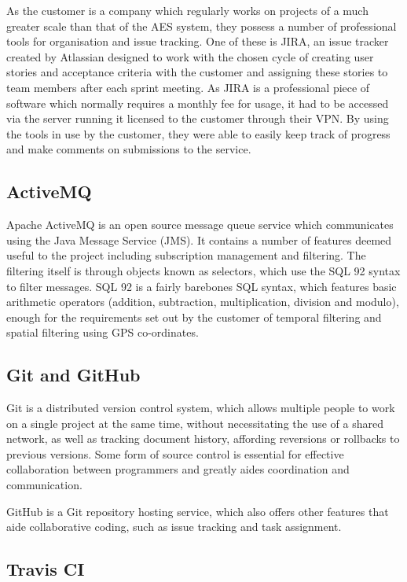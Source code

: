 \documentclass[a4paper, 12pt, twoside]{article}
\begin{document}
As the customer is a company which regularly works on projects of a much greater scale than that of the AES system, they possess a number of professional tools for organisation and issue tracking. One of these is JIRA, an issue tracker created by Atlassian designed to work with the chosen cycle of creating user stories and acceptance criteria with the customer and assigning these stories to team members after each sprint meeting. As JIRA is a professional piece of software which normally requires a monthly fee for usage, it had to be accessed via the server running it licensed to the customer through their VPN. By using the tools in use by the customer, they were able to easily keep track of progress and make comments on submissions to the service.

\subsection{ActiveMQ}
\label{sec:bg_activemq}

Apache ActiveMQ is an open source message queue service which communicates using the Java Message Service (JMS). It contains a number of features deemed useful to the project including subscription management and filtering. The filtering itself is through objects known as selectors, which use the SQL 92 syntax to filter messages. SQL 92 is a fairly barebones SQL syntax, which features basic arithmetic operators (addition, subtraction, multiplication, division and modulo), enough for the requirements set out by the customer of temporal filtering and spatial filtering using GPS co-ordinates.

\subsection{Git and GitHub}
\label{sec:bg_git}

Git is a distributed version control system, which allows multiple people to work on a single project at the same time, without necessitating the use of a shared network, as well as tracking document history, affording reversions or rollbacks to previous versions. Some form of source control is essential for effective collaboration between programmers and greatly aides coordination and communication.

GitHub is a Git repository hosting service, which also offers other features that aide collaborative coding, such as issue tracking and task assignment.

\subsection{Travis CI}
\label{sec:bg_travis}
\end{document}
